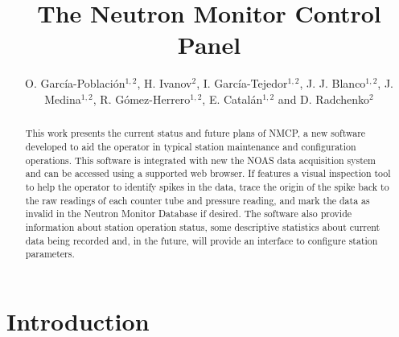 \documentclass[a4paper]{jpconf}
\begin{document}
\title{The Neutron Monitor Control Panel}

\author{O. García-Población$^{1,2}$, H. Ivanov$^2$, I. García-Tejedor$^{1,2}$,
J. J. Blanco$^{1,2}$, J. Medina$^{1,2}$, R. Gómez-Herrero$^{1,2}$, E.
Catalán$^{1,2}$ and D. Radchenko$^{2}$}

\address{$^1$ Space Research Group, University of Alcalá, Spain}
\address{$^2$ Castilla-La Mancha Neutron Monitor, Parque Tecnológico de Guadalajara, Spain}


\begin{abstract}
    This work presents the current status and future plans of NMCP, a new
    software developed to aid the operator in typical station maintenance and
    configuration operations. This software is integrated with new the NOAS
    data acquisition system and can be accessed using a supported web browser.
    If features a visual inspection tool to help the operator to identify
    spikes in the data, trace the origin of the spike back to the raw readings
    of each counter tube and pressure reading, and mark the data as invalid in
    the Neutron Monitor Database if desired. The software also provide
    information about station operation status, some descriptive statistics
    about current data being recorded and, in the future, will provide an
    interface to configure station parameters.
\end{abstract}

\section{Introduction}
\end{document}
